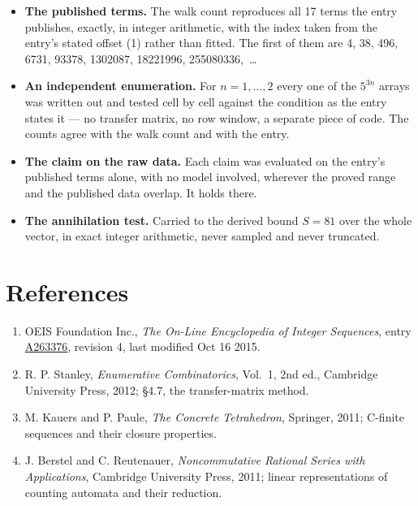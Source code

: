 \documentclass[11pt]{article}
\theoremstyle{definition}
\begin{document}
\begin{itemize}

\item {\bfseries The published terms.} The walk count reproduces all 17 terms the entry publishes, exactly, in integer arithmetic, with the index taken from the entry's stated offset (1) rather than fitted. The first of them are 4, 38, 496, 6731, 93378, 1302087, 18221996, 255080336,~\dots

\item {\bfseries An independent enumeration.} For $n = 1,\dots,2$ every one of the $5^{3n}$ arrays was written out and tested cell by cell against the condition as the entry states it --- no transfer matrix, no row window, a separate piece of code. The counts agree with the walk count and with the entry.

\item {\bfseries The claim on the raw data.} Each claim was evaluated on the entry's published terms alone, with no model involved, wherever the proved range and the published data overlap. It holds there.

\item {\bfseries The annihilation test.} Carried to the derived bound $S = 81$ over the whole vector, in exact integer arithmetic, never sampled and never truncated.

\end{itemize}

\section{References}

\begin{enumerate}

\item OEIS Foundation Inc., \emph{The On-Line Encyclopedia of Integer Sequences}, entry \href{https://oeis.org/A263376}{A263376}, revision 4, last modified Oct 16 2015.

\item R. P. Stanley, \emph{Enumerative Combinatorics}, Vol.~1, 2nd ed., Cambridge University Press, 2012; \S4.7, the transfer-matrix method.

\item M. Kauers and P. Paule, \emph{The Concrete Tetrahedron}, Springer, 2011; C-finite sequences and their closure properties.

\item J. Berstel and C. Reutenauer, \emph{Noncommutative Rational Series with Applications}, Cambridge University Press, 2011; linear representations of counting automata and their reduction.

\end{enumerate}
\end{document}
